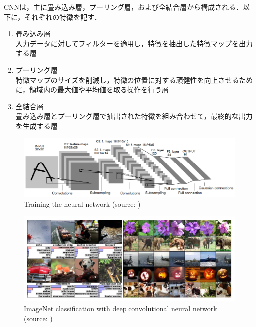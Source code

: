   CNNは，主に畳み込み層，プーリング層，および全結合層から構成される．以下に，それぞれの特徴を記す．

  \begin{enumerate}
    \item 畳み込み層\\
    入力データに対してフィルターを適用し，特徴を抽出した特徴マップを出力する層
    \item プーリング層\\
    特徴マップのサイズを削減し，特徴の位置に対する頑健性を向上させるために，領域内の最大値や平均値を取る操作を行う層
    \item 全結合層\\
    畳み込み層とプーリング層で抽出された特徴を組み合わせて，最終的な出力を生成する層
  \end{enumerate}

  \begin{figure}[h]
    \centering
    \includegraphics[keepaspectratio, scale=0.80] {images/pdf/yann_CNN}
    \caption[Training the neural network]{Training the neural network (source: \cite{yann1})}
    \label{Fig:yann_CNN}
  \end{figure}

\newpage

  \begin{figure}[h]
    \centering
    \includegraphics[keepaspectratio, scale=0.80] {images/pdf/deep_convolutional_neural_networks}
    \caption[ImageNet classification with deep convolutional neural network]{ImageNet classification with deep convolutional neural network (source: \cite{alex})}
    \label{Fig:deep_convolutional_neural_networks}
  \end{figure}


\newpage

